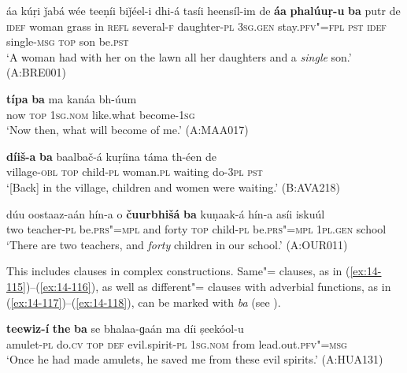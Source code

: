 \begin{exe}
\ex
\label{ex:14-111}
\gll áa kúṛi ǰabá wée teeṇíi biǰéel-i dhi-á  tasíi heensíl-im de \textbf{áa} \textbf{phalúuṛ-u} \textbf{ba} putr de\\
\textsc{idef} woman grass in \textsc{refl} several-\textsc{f} daughter-\textsc{pl} \textsc{3sg.gen} stay.\textsc{pfv"=fpl} \textsc{pst} \textsc{idef} single-\textsc{msg} \textsc{top} son be.\textsc{pst}\\
\glt `A woman had with her on the lawn all her daughters and a \textit{single} son.' (A:BRE001)

\ex
\label{ex:14-112}
\gll \textbf{típa} \textbf{ba} ma kanáa bh-úum \\
now \textsc{top} \textsc{1sg.nom} like.what become-\textsc{1sg } \\
\glt `Now then, what will become of me.' (A:MAA017)

\ex
\label{ex:14-113}
\gll \textbf{díiš-a} \textbf{ba} baalbač-á kuṛíina táma  th-éen de \\
village-\textsc{obl} \textsc{top} child-\textsc{pl} woman.\textsc{pl} waiting do-\textsc{3pl} \textsc{pst } \\
\glt `[Back] in the village, children and women were waiting.' (B:AVA218)

\ex
\label{ex:14-114}
\gll dúu oostaaz-aán hín-a o \textbf{čuurbhišá} \textbf{ ba} kuṇaak-á hín-a asíi iskuúl \\
two teacher-\textsc{pl} be.\textsc{prs"=mpl} and forty  \textsc{top} child-\textsc{pl} be.\textsc{prs"=mpl} \textsc{1pl.gen} school  \\
\glt `There are two teachers, and \textit{forty} children in our school.' (A:OUR011)
\end{exe}

This includes clauses in complex constructions. Same"= clauses, as in (\ref{ex:14-115})--(\ref{ex:14-116}), as well as different"= clauses with adverbial functions, as in (\ref{ex:14-117})--(\ref{ex:14-118}), can be marked with \textit{ba} (see ).

\ea
\label{ex:14-115}
\gll \textbf{teewiz-í} \textbf{the} \textbf{ba} se bhalaa-ɡaán ma  díi ṣeekóol-u \\
amulet-\textsc{pl} do.\textsc{cv} \textsc{top} \textsc{def} evil.spirit-\textsc{pl} \textsc{1sg.nom} from lead.out.\textsc{pfv"=msg}{\protect\footnotemark} \\
\glt `Once he had made amulets, he saved me from these evil spirits.' (A:HUA131)

